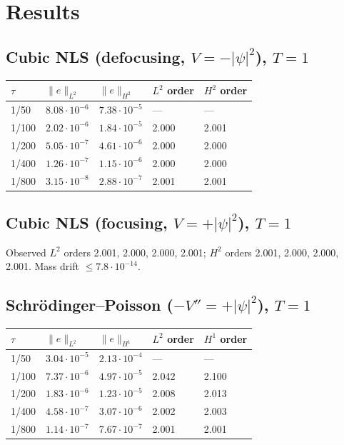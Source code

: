 \documentclass[11pt]{article}
\begin{document}
\section{Results}

\subsection{Cubic NLS (defocusing, $V=-|\psi|^2$), $T=1$}
\begin{center}\small
\begin{tabular}{lllll}
\toprule
$\tau$ & $\|e\|_{L^2}$ & $\|e\|_{H^2}$ & $L^2$ order & $H^2$ order \\ \midrule
1/50   & $8.08\!\cdot\!10^{-6}$ & $7.38\!\cdot\!10^{-5}$ & --- & --- \\
1/100  & $2.02\!\cdot\!10^{-6}$ & $1.84\!\cdot\!10^{-5}$ & 2.000 & 2.001 \\
1/200  & $5.05\!\cdot\!10^{-7}$ & $4.61\!\cdot\!10^{-6}$ & 2.000 & 2.000 \\
1/400  & $1.26\!\cdot\!10^{-7}$ & $1.15\!\cdot\!10^{-6}$ & 2.000 & 2.000 \\
1/800  & $3.15\!\cdot\!10^{-8}$ & $2.88\!\cdot\!10^{-7}$ & 2.001 & 2.001 \\
\bottomrule
\end{tabular}
\end{center}

\subsection{Cubic NLS (focusing, $V=+|\psi|^2$), $T=1$}
Observed $L^2$ orders 2.001, 2.000, 2.000, 2.001; $H^2$ orders 2.001, 2.000,
2.000, 2.001. Mass drift $\le 7.8\!\cdot\!10^{-14}$.

\subsection{Schr\"odinger--Poisson ($-V''=+|\psi|^2$), $T=1$}
\begin{center}\small
\begin{tabular}{lllll}
\toprule
$\tau$ & $\|e\|_{L^2}$ & $\|e\|_{H^1}$ & $L^2$ order & $H^1$ order \\ \midrule
1/50   & $3.04\!\cdot\!10^{-5}$ & $2.13\!\cdot\!10^{-4}$ & --- & --- \\
1/100  & $7.37\!\cdot\!10^{-6}$ & $4.97\!\cdot\!10^{-5}$ & 2.042 & 2.100 \\
1/200  & $1.83\!\cdot\!10^{-6}$ & $1.23\!\cdot\!10^{-5}$ & 2.008 & 2.013 \\
1/400  & $4.58\!\cdot\!10^{-7}$ & $3.07\!\cdot\!10^{-6}$ & 2.002 & 2.003 \\
1/800  & $1.14\!\cdot\!10^{-7}$ & $7.67\!\cdot\!10^{-7}$ & 2.001 & 2.001 \\
\bottomrule
\end{tabular}
\end{center}
\end{document}
